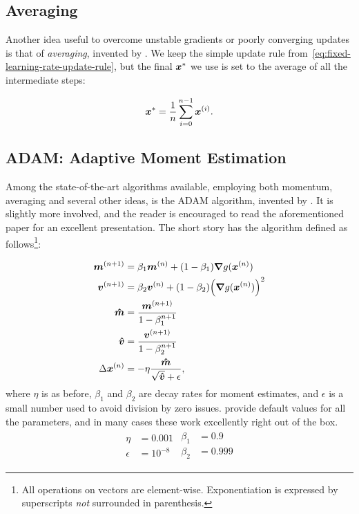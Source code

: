 \documentclass[Thesis.tex]{subfiles}
\begin{document}
\subsection{Averaging}

Another idea useful to overcome unstable gradients or poorly converging updates
is that of \emph{averaging}, invented by \textcite{Polyak-1992}. We keep the
simple update rule from~\cref{eq:fixed-learning-rate-update-rule}, but the final
$\bm{x}^*$ we use is set to the average of all the intermediate steps:

\begin{align}
  \label{eq:averaging-update-rule-def}
  \bm{x}^* = \frac{1}{n}\sum_{i=0}^{n-1} \bm{x}^{(i)}.
\end{align}

\subsection{ADAM: Adaptive Moment Estimation}

Among the state-of-the-art algorithms available, employing both momentum,
averaging and several other ideas, is the ADAM algorithm, invented by
\textcite{KingmaB14}. It is slightly more involved, and the reader is encouraged
to read the aforementioned paper for an excellent presentation. The short story
has the algorithm defined as follows\footnote{All operations on vectors are
  element-wise. Exponentiation is expressed by superscripts \emph{not}
  surrounded in parenthesis.}:

\begin{align}
  \bm{m}^{(n+1)} &= \beta_1 \bm{m}^{(n)} + (1 - \beta_1)\grad{g(\bm{x}^{(n)})}\\
  \bm{v}^{(n+1)} &= \beta_2 \bm{v}^{(n)} + (1 - \beta_2)\qty(\grad{g(\bm{x}^{(n)})})^2\\
  \bm{\hat m} &= \frac{\bm{m}^{(n+1)}}{1 - \beta_1^{n+1}}\\
  \bm{\hat v} &= \frac{\bm{v}^{(n+1)}}{1 - \beta_2^{n+1}}\\
  \Delta \bm{x}^{(n)}&= -\eta \frac{\bm{\hat m}}{\sqrt{\bm{\hat v}} + \epsilon},
\end{align}
where $\eta$ is as before, $\beta_1$ and $\beta_2$ are decay rates for moment
estimates, and $\epsilon$ is a small number used to avoid division by zero
issues. \textcite{KingmaB14} provide default values for all the parameters, and
in many cases these work excellently right out of the box.
\begin{align}
  \label{eq:adam-default-parameters}
  \begin{split}
    \eta &= 0.001\\
    \epsilon &= 10^{-8}
  \end{split}
  \begin{split}
    \beta_1 &= 0.9\\
    \beta_2 &= 0.999
  \end{split}
\end{align}
\end{document}
